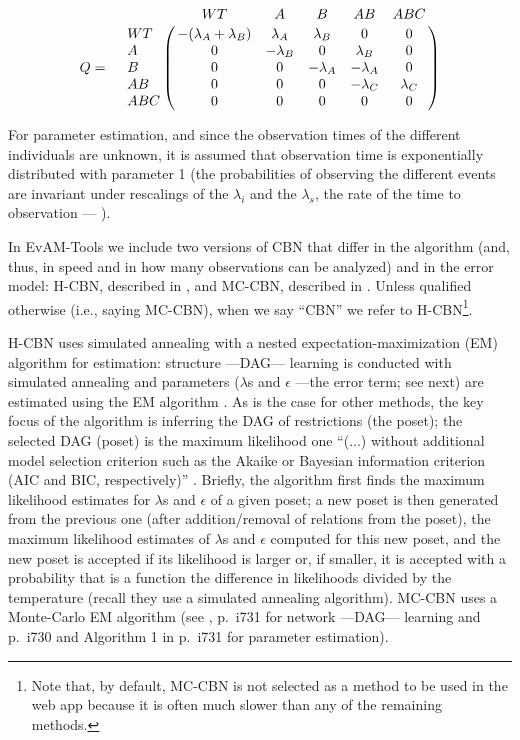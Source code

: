 \documentclass[a4paper,11pt]{article}
\begin{document}
\begin{equation}\label{eq:ratecbn}
  Q = \quad \bordermatrix{
    & WT & A & B & AB & ABC \cr
    WT  & -(\lambda_A + \lambda_B) & \lambda_A & \lambda_B & 0 & 0 \cr
    A   & 0 & -\lambda_B & 0 & \lambda_B & 0 \cr
    B   & 0 & 0 & -\lambda_A & -\lambda_A & 0 \cr
    AB  & 0 & 0 & 0 & -\lambda_C & \lambda_C \cr
    ABC & 0 & 0 & 0 & 0 & 0 \cr
  }
\end{equation}




For parameter estimation, and since the observation times of the different individuals are unknown, it is assumed that observation time is exponentially distributed with parameter 1 (the probabilities of observing the different events are invariant under rescalings of the $\lambda_i$ and the $\lambda_s$, the rate of the time to observation --- \citealp{gerstung2009quantifying}).

In EvAM-Tools we include two versions of CBN that differ in the algorithm (and, thus, in speed and in how many observations can be analyzed) and in the error model: H-CBN, described in \citet{gerstung2009quantifying, gerstung2011temporal}, and MC-CBN, described in \citet{montazeri2016large}. Unless qualified otherwise (i.e., saying MC-CBN), when we say ``CBN'' we refer to H-CBN\footnote{Note that, by default, MC-CBN is not selected as a method to be used in the web app because it is often much slower than any of the remaining methods.}.


H-CBN uses simulated annealing with a nested expectation-maximization (EM) algorithm for estimation: structure ---DAG--- learning is conducted with simulated annealing and parameters ($\lambda$s and $\epsilon$ ---the error term; see next) are estimated using the EM algorithm \citep[section 2.3, pp.~2810--2811 of][]{gerstung2009quantifying}. As is the case for other methods, the key focus of the algorithm is inferring the DAG of restrictions (the poset); the selected DAG (poset) is the maximum likelihood one ``(...) without additional model selection criterion such as the Akaike or Bayesian information criterion (AIC and BIC, respectively)'' \citep[p.~2811]{gerstung2009quantifying}. Briefly, the algorithm first finds the maximum likelihood estimates for $\lambda$s and $\epsilon$ of a given poset; a new poset is then generated from the previous one (after addition/removal of relations from the poset), the maximum likelihood estimates of $\lambda$s and $\epsilon$ computed for this new poset, and the new poset is accepted if its likelihood is larger or, if smaller, it is accepted with a probability that is a function the difference in likelihoods divided by the temperature (recall they use a simulated annealing algorithm). MC-CBN uses a Monte-Carlo EM algorithm (see \citealp{montazeri2016large}, p.~i731 for network ---DAG--- learning and p.~i730 and Algorithm 1 in p.~i731 for parameter estimation).
\end{document}
